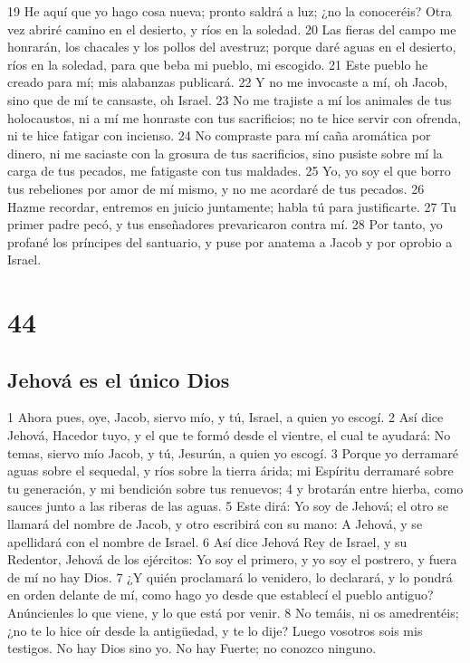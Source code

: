 19 He aquí que yo hago cosa nueva; pronto saldrá a luz; ¿no la conoceréis? Otra vez abriré camino en el desierto, y ríos en la soledad.
20 Las fieras del campo me honrarán, los chacales y los pollos del avestruz; porque daré aguas en el desierto, ríos en la soledad, para que beba mi pueblo, mi escogido.
21 Este pueblo he creado para mí; mis alabanzas publicará.
22 Y no me invocaste a mí, oh Jacob, sino que de mí te cansaste, oh Israel.
23 No me trajiste a mí los animales de tus holocaustos, ni a mí me honraste con tus sacrificios; no te hice servir con ofrenda, ni te hice fatigar con incienso.
24 No compraste para mí caña aromática por dinero, ni me saciaste con la grosura de tus sacrificios, sino pusiste sobre mí la carga de tus pecados, me fatigaste con tus maldades.
25 Yo, yo soy el que borro tus rebeliones por amor de mí mismo, y no me acordaré de tus pecados.
26 Hazme recordar, entremos en juicio juntamente; habla tú para justificarte.
27 Tu primer padre pecó, y tus enseñadores prevaricaron contra mí.
28 Por tanto, yo profané los príncipes del santuario, y puse por anatema a Jacob y por oprobio a Israel.

\chapter{44}

\section*{Jehová es el único Dios}

1 Ahora pues, oye, Jacob, siervo mío, y tú, Israel, a quien yo escogí.
2 Así dice Jehová, Hacedor tuyo, y el que te formó desde el vientre, el cual te ayudará: No temas, siervo mío Jacob, y tú, Jesurún, a quien yo escogí.
3 Porque yo derramaré aguas sobre el sequedal, y ríos sobre la tierra árida; mi Espíritu derramaré sobre tu generación, y mi bendición sobre tus renuevos;
4 y brotarán entre hierba, como sauces junto a las riberas de las aguas.
5 Este dirá: Yo soy de Jehová; el otro se llamará del nombre de Jacob, y otro escribirá con su mano: A Jehová, y se apellidará con el nombre de Israel.
6 Así dice Jehová Rey de Israel, y su Redentor, Jehová de los ejércitos: Yo soy el primero, y yo soy el postrero, y fuera de mí no hay Dios.
7 ¿Y quién proclamará lo venidero, lo declarará, y lo pondrá en orden delante de mí, como hago yo desde que establecí el pueblo antiguo? Anúncienles lo que viene, y lo que está por venir.
8 No temáis, ni os amedrentéis; ¿no te lo hice oír desde la antigüedad, y te lo dije? Luego vosotros sois mis testigos. No hay Dios sino yo. No hay Fuerte; no conozco ninguno.

